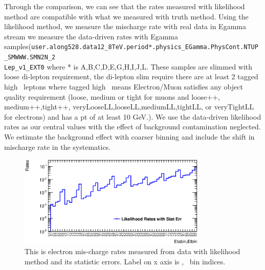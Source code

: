 Through the comparison, we can see that the rates measured with
likelihood method are compatible with what we measured with truth
method. Using the likelihood method, we measure the mischarge rate
with real data in Egamma stream we measure the data-driven rates with
Egamma
samples(\texttt{user.along528.data12\_8TeV.period*.physics\_EGamma.PhysCont.NTUP\_SMWWW.SMN2N\_2\\Lep\_v1\_EXT0}
where * is A,B,C,D,E,G,H,I,J,L. These samples are slimmed with loose
di-lepton requirement, the di-lepton slim require there are at least 2
tagged high \pt\ leptons where tagged high \pt\ means Electron/Muon
satisfies any object quality requirement (loose, medium or tight for
muons and loose++,\\medium++,tight++,
veryLooseLL,looseLL,mediumLL,tightLL, or veryTightLL for electrons)
and has a pt of at least 10 GeV.). We use the data-driven likelihood
rates as our central values with the effect of background
contamination neglected. We estimate the background effect with
coarser binning and include the shift in mischarge rate in the
systematics.


\begin{figure}[htp]
\centering
\includegraphics[width=0.8\textwidth]{figures/ChargeMisID/Egamma_LL.eps}
\caption{This is electron mis-charge rates measured from data with likelihood method and its statistic errors. Label on x axis is \eta, \pt\ bin indices.}
\label{fig:LL_Rates_Egamma}
\end{figure}

